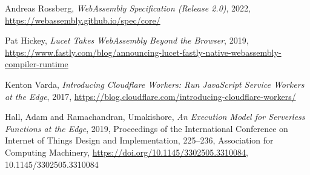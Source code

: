 \begin{thebibliography}{00}

 Andreas Rossberg, \textit{WebAssembly Specification (Release 2.0)}, 2022, \url{https://webassembly.github.io/spec/core/}

 Pat Hickey, \textit{Lucet Takes WebAssembly Beyond the Browser}, 2019, \url{https://www.fastly.com/blog/announcing-lucet-fastly-native-webassembly-compiler-runtime}

 Kenton Varda, \textit{Introducing Cloudflare Workers: Run JavaScript Service Workers at the Edge}, 2017, \url{https://blog.cloudflare.com/introducing-cloudflare-workers/}

 Hall, Adam and Ramachandran, Umakishore, \textit{An Execution Model for Serverless Functions at the Edge}, 2019,
 Proceedings of the International Conference on Internet of Things Design and Implementation, 225–236, Association for Computing Machinery, \url{https://doi.org/10.1145/3302505.3310084}, 10.1145/3302505.3310084


\end{thebibliography}
